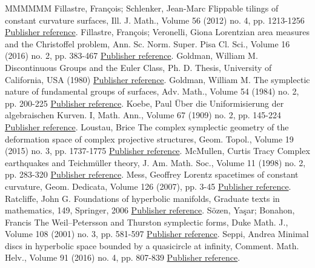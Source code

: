 \begin{thebibliography}{MMMMMM}
 Fillastre, François; Schlenker, Jean-Marc Flippable tilings of constant curvature surfaces, Ill. J. Math., Volume 56 (2012) no. 4, pp. 1213-1256 \href{https://ahl.centre-mersenne.org/item/AHL_2020__3__873_0/#flippable}{Publisher reference}.
 Fillastre, François; Veronelli, Giona Lorentzian area measures and the Christoffel problem, Ann. Sc. Norm. Super. Pisa Cl. Sci., Volume 16 (2016) no. 2, pp. 383-467 \href{https://ahl.centre-mersenne.org/item/AHL_2020__3__873_0/#Fillastre}{Publisher reference}.
 Goldman, William M. Discontinuous Groups and the Euler Class, Ph. D. Thesis, University of California, USA (1980) \href{https://ahl.centre-mersenne.org/item/AHL_2020__3__873_0/#goldmanthesis}{Publisher reference}.
 Goldman, William M. The symplectic nature of fundamental groups of surfaces, Adv. Math., Volume 54 (1984) no. 2, pp. 200-225 \href{https://ahl.centre-mersenne.org/item/AHL_2020__3__873_0/#Goldman}{Publisher reference}.
 Koebe, Paul Über die Uniformisierung der algebraischen Kurven. I, Math. Ann., Volume 67 (1909) no. 2, pp. 145-224 \href{https://ahl.centre-mersenne.org/item/AHL_2020__3__873_0/#koebeunif}{Publisher reference}.
 Loustau, Brice The complex symplectic geometry of the deformation space of complex projective structures, Geom. Topol., Volume 19 (2015) no. 3, pp. 1737-1775 \href{https://ahl.centre-mersenne.org/item/AHL_2020__3__873_0/#bricegt}{Publisher reference}.
 McMullen, Curtis Tracy Complex earthquakes and Teichmüller theory, J. Am. Math. Soc., Volume 11 (1998) no. 2, pp. 283-320 \href{https://ahl.centre-mersenne.org/item/AHL_2020__3__873_0/#mcmullerearth}{Publisher reference}.
 Mess, Geoffrey Lorentz spacetimes of constant curvature, Geom. Dedicata, Volume 126 (2007), pp. 3-45 \href{https://ahl.centre-mersenne.org/item/AHL_2020__3__873_0/#mess}{Publisher reference}.
 Ratcliffe, John G. Foundations of hyperbolic manifolds, Graduate texts in mathematics, 149, Springer, 2006 \href{https://ahl.centre-mersenne.org/item/AHL_2020__3__873_0/#opac-b1124711}{Publisher reference}.
 Sözen, Yaşar; Bonahon, Francis The Weil–Petersson and Thurston symplectic forms, Duke Math. J., Volume 108 (2001) no. 3, pp. 581-597 \href{https://ahl.centre-mersenne.org/item/AHL_2020__3__873_0/#SB}{Publisher reference}.
 Seppi, Andrea Minimal discs in hyperbolic space bounded by a quasicircle at infinity, Comment. Math. Helv., Volume 91 (2016) no. 4, pp. 807-839 \href{https://ahl.centre-mersenne.org/item/AHL_2020__3__873_0/#seppiminimal}{Publisher reference}.

\end{thebibliography}
